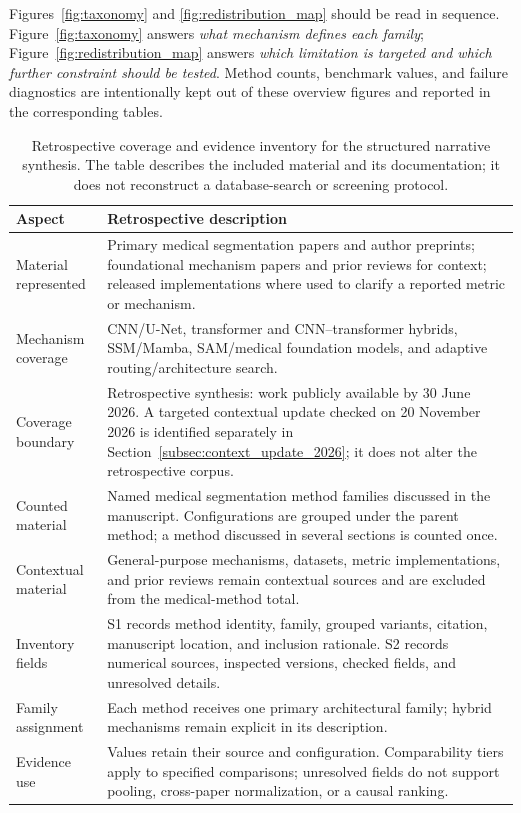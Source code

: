 \documentclass[5p,times,authoryear]{elsarticle}
\begin{document}
Figures~\ref{fig:taxonomy} and \ref{fig:redistribution_map} should be read in sequence. Figure~\ref{fig:taxonomy} answers \emph{what mechanism defines each family}; Figure~\ref{fig:redistribution_map} answers \emph{which limitation is targeted and which further constraint should be tested}. Method counts, benchmark values, and failure diagnostics are intentionally kept out of these overview figures and reported in the corresponding tables.
\begin{table}[t]
\centering
\caption{Retrospective coverage and evidence inventory for the structured narrative synthesis. The table describes the included material and its documentation; it does not reconstruct a database-search or screening protocol.}
\label{tab:protocol}
\footnotesize\renewcommand{\arraystretch}{1.16}\setlength{\tabcolsep}{5pt}
\begin{tabularx}{\textwidth}{>{\raggedright\arraybackslash}p{3.1cm}>{\raggedright\arraybackslash}X}
\toprule
\textbf{Aspect} & \textbf{Retrospective description} \\
\midrule
Material represented & Primary medical segmentation papers and author preprints; foundational mechanism papers and prior reviews for context; released implementations where used to clarify a reported metric or mechanism. \\
Mechanism coverage & CNN/U-Net, transformer and CNN--transformer hybrids, SSM/Mamba, SAM/medical foundation models, and adaptive routing/architecture search. \\
Coverage boundary & Retrospective synthesis: work publicly available by 30 June 2026. A targeted contextual update checked on 20 November 2026 is identified separately in Section~\ref{subsec:context_update_2026}; it does not alter the retrospective corpus. \\
Counted material & Named medical segmentation method families discussed in the manuscript. Configurations are grouped under the parent method; a method discussed in several sections is counted once. \\
Contextual material & General-purpose mechanisms, datasets, metric implementations, and prior reviews remain contextual sources and are excluded from the medical-method total. \\
Inventory fields & S1 records method identity, family, grouped variants, citation, manuscript location, and inclusion rationale. S2 records numerical sources, inspected versions, checked fields, and unresolved details. \\
Family assignment & Each method receives one primary architectural family; hybrid mechanisms remain explicit in its description. \\
Evidence use & Values retain their source and configuration. Comparability tiers apply to specified comparisons; unresolved fields do not support pooling, cross-paper normalization, or a causal ranking. \\
\bottomrule
\end{tabularx}
\end{table}
\end{document}
